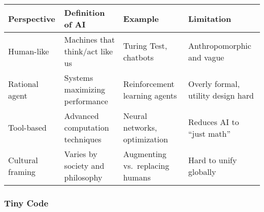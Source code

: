 \documentclass[
  letterpaper,
  DIV=11,
  numbers=noendperiod]{scrreprt}
\begin{document}
\begin{longtable}[]{@{}
  >{\raggedright\arraybackslash}p{}
  >{\raggedright\arraybackslash}p{}
  >{\raggedright\arraybackslash}p{}
  >{\raggedright\arraybackslash}p{}@{}}
\toprule\noalign{}
\begin{minipage}[b]{\linewidth}\raggedright
Perspective
\end{minipage} & \begin{minipage}[b]{\linewidth}\raggedright
Definition of AI
\end{minipage} & \begin{minipage}[b]{\linewidth}\raggedright
Example
\end{minipage} & \begin{minipage}[b]{\linewidth}\raggedright
Limitation
\end{minipage} \\
\midrule\noalign{}
\endhead
\bottomrule\noalign{}
\endlastfoot
Human-like & Machines that think/act like us & Turing Test, chatbots &
Anthropomorphic and vague \\
Rational agent & Systems maximizing performance & Reinforcement learning
agents & Overly formal, utility design hard \\
Tool-based & Advanced computation techniques & Neural networks,
optimization & Reduces AI to ``just math'' \\
Cultural framing & Varies by society and philosophy & Augmenting
vs.~replacing humans & Hard to unify globally \\
\end{longtable}

\subsubsection{Tiny Code}\label{tiny-code-9}
\end{document}
